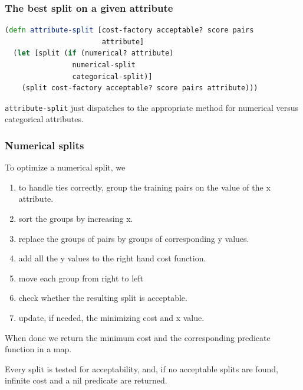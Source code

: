 \documentclass[10pt,openany]{article}
\numberwithin{definition}{section}
\numberwithin{example}{section}
\numberwithin{equation}{section}
\numberwithin{figure}{section}
\begin{document}
\subsubsection{The best split on a given attribute}

\begin{minipage}[t]{1\columnwidth}%
\begin{lstlisting}[caption={Best split for a given attribute},label={lis:attribute-split},language=clojure,tabsize=2]
(defn attribute-split [cost-factory acceptable? score pairs 
                       attribute]
  (let [split (if (numerical? attribute) 
                numerical-split 
                categorical-split)] 
    (split cost-factory acceptable? score pairs attribute))) 
\end{lstlisting}
%
\end{minipage}

\texttt{attribute-split} just dispatches to the appropriate method
for numerical versus categorical attributes.

\subsubsection{Numerical splits}

To optimize a numerical split, we 
\begin{enumerate}
\item to handle ties correctly, group the training pairs on the value of
the x attribute.
\item sort the groups by increasing x.
\item replace the groups of pairs by groups of corresponding y values.
\item add all the y values to the right hand cost function.
\item move each group from right to left 
\item check whether the resulting split is acceptable.
\item update, if needed, the minimizing cost and x value.
\end{enumerate}
When done we return the minimum cost and the corresponding predicate
function in a map.

Every split is tested for acceptability, and, if no acceptable splits
are found, infinite cost and a nil predicate are returned.
\end{document}
